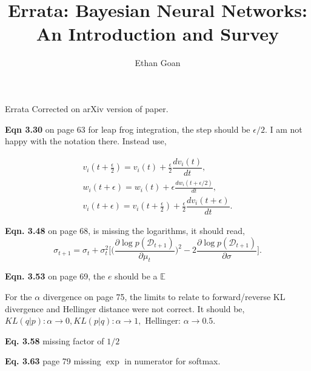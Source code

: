 \documentclass{article}
\title{{\titlefont Errata: Bayesian Neural Networks: An Introduction and Survey}}
\author{{\authorfont Ethan Goan}}
\date{} %
\begin{document}
\maketitle
\thispagestyle{fancy} %
Errata Corrected on arXiv version of paper.

\textbf{Eqn 3.30} on page 63 for leap frog integration, the step should be $\epsilon/2$. I am not happy with the notation there. Instead use,

\begin{align*}
  v_i(t + \frac{\epsilon}{2}) = v_i(t) + \frac{\epsilon}{2} \dfrac{dv_{i}(t)}{dt},
  \\
  w_i(t + \epsilon) = w_i(t) + \epsilon \frac{dw_{i}(t + \epsilon /2)}{dt},
  \\
  v_i(t + \epsilon) = v_i(t +\frac{\epsilon}{2}) + \frac{\epsilon}{2} \dfrac{dv_{i}(t + \epsilon)}{dt}.
\end{align*}

\textbf{Eqn. 3.48} on page 68, is missing the logarithms, it should read,
\begin{equation*}
    \sigma_{t+1} =
                 \sigma_t + \sigma_t^2 \Big[ \big( \dfrac{\partial \log p(\mathcal{D}_{t+1})}{\partial \mu_t} \big)^2 -
                 2 \dfrac{\partial \log p(\mathcal{D}_{t+1})}{ \partial \sigma} \Big].
\end{equation*}


\textbf{Eqn. 3.53} on page 69, the $e$ should be a $\mathbb{E}$
  
For the $\alpha$ divergence on page 75, the limits to relate to forward/reverse KL divergence and Hellinger distance were not correct. It should be, $KL(q|p): \alpha \rightarrow 0, KL(p|q): \alpha \rightarrow 1,$ Hellinger: $ \alpha \rightarrow 0.5$.

\textbf{Eq. 3.58} missing factor of $1/2$

\textbf{Eq. 3.63} page 79 missing $\exp$ in numerator for softmax.
\end{document}
